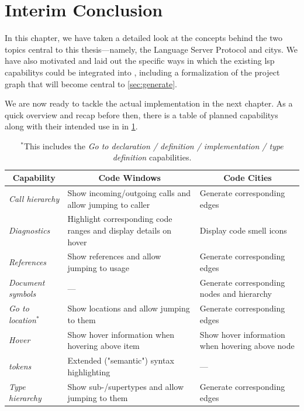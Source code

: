 \documentclass[../thesis]{subfiles}
\begin{document}
\section{Interim Conclusion}
In this chapter, we have taken a detailed look at the concepts behind the two topics central to this thesis---namely, the {Language Server Protocol} and \glspl{city}.
We have also motivated and laid out the specific ways in which the existing \gls{lsp} \glspl{capability} could be integrated into \SEE{}, including a formalization of the project graph that will become central to \cref{sec:generate}.

We are now ready to tackle the actual implementation in the next chapter.
As a quick overview and recap before then, there is a table of planned \glspl{capability} along with their intended use in \SEE{} in \cref{tab:capabilities}.

\begin{table}[htbp]
\caption{\gls{lsp} \glspl{capability} that will be integrated into \SEE{} as part of this thesis.}\label{tab:capabilities}
\begin{tabularx}{\textwidth}{@{}lXX@{}}
	\toprule
	\multicolumn{1}{c}{\textbf{Capability}} & \multicolumn{1}{c}{\textbf{Code Windows}}                        & \multicolumn{1}{c}{\textbf{Code Cities}}            \\ \midrule
	\textit{Call hierarchy}                 & Show incoming/outgoing calls and allow jumping to caller         & Generate corresponding edges                        \\
	\textit{Diagnostics}                    & Highlight corresponding code \glspl{range} and display details on hover & Display code smell icons~\cite[see][]{galperin2021} \\
	\textit{References}                     & Show references and allow jumping to usage                       & Generate corresponding edges                        \\
	\textit{Document symbols}               & ---                                                              & Generate corresponding nodes and hierarchy          \\
  \textit{Go to location$^*$}                                     & Show locations and allow jumping to them                         & Generate corresponding edges                        \\
	\textit{Hover}                          & Show hover information when hovering above item                  & Show hover information when hovering above node     \\
  \textit{\glspl{token}}                & Extended ("semantic") syntax highlighting                        & ---                                                 \\
	\textit{Type hierarchy}                 & Show sub-/supertypes and allow jumping to them                   & Generate corresponding edges                        \\\bottomrule
\end{tabularx}
\caption*{\footnotesize $^*$This includes the \textit{Go to declaration / definition / implementation / type definition} capabilities.}
\end{table}
\end{document}
